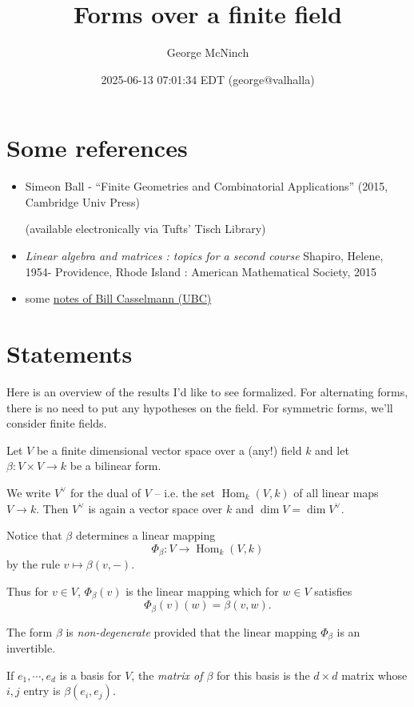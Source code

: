 \documentclass[11pt]{article}
\author{George McNinch}
\date{2025-06-13 07:01:34 EDT (george@valhalla)}
\title{Forms over a finite field}
\numberwithin{equation}{section}
\newcommand{\Hom}{\operatorname{Hom}}
\begin{document}
\maketitle
\section{Some references}
\label{sec:org4068d7f}

\begin{itemize}
\item Simeon Ball - ``Finite Geometries and Combinatorial Applications'' (2015, Cambridge Univ Press)

(available electronically via Tufts' Tisch Library)

\item \emph{Linear algebra and matrices : topics for a second course}
Shapiro, Helene, 1954-
Providence, Rhode Island : American Mathematical Society, 2015

\item some \href{https://personal.math.ubc.ca/\~cass/siegel/FiniteFields.pdf}{notes of Bill Casselmann (UBC)}
\end{itemize}
\section{Statements}
\label{sec:orga960f8a}

Here is an overview of the results I'd like to see formalized. For
alternating forms, there is no need to put any hypotheses on the
field. For symmetric forms, we'll consider finite fields.


Let \(V\) be a finite dimensional vector space over a (any!) field
\(k\) and let \(\beta:V \times V \to k\) be a bilinear form.

We write \(V^\vee\) for the dual of \(V\) -- i.e. the set
\(\Hom_k(V,k)\) of all linear maps \(V \to k\).  Then \(V^\vee\) is
again a vector space over \(k\) and \(\dim V = \dim V^\vee.\)

Notice that \(\beta\) determines a linear mapping
\[\Phi_\beta:V \to \Hom_k(V,k)\] by the rule
\(v \mapsto \beta(v,-).\)

Thus for \(v \in V\), \(\Phi_\beta(v)\) is the linear mapping which for \(w\in V\) satisfies
\[\Phi_\beta(v)(w) = \beta(v,w).\]

The form \(\beta\) is \emph{non-degenerate} provided that the linear mapping
\(\Phi_\beta\) is an invertible.

If \(e_1,\cdots,e_d\) is a basis for \(V\), the \emph{matrix of \(\beta\)}
for this basis is the \(d \times d\) matrix whose \(i,j\) entry is
\(\beta(e_i,e_j)\).
\end{document}
